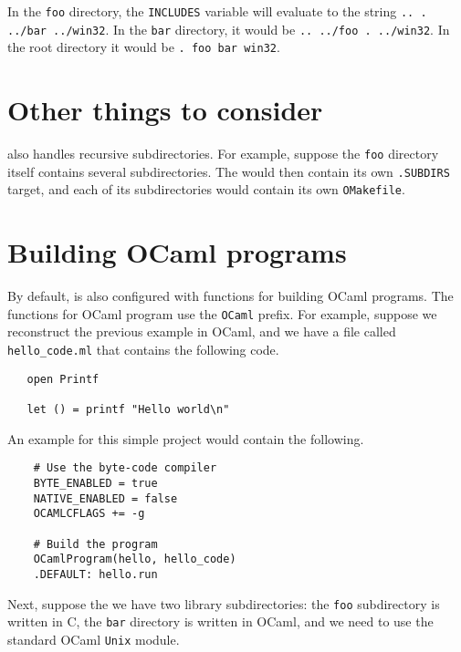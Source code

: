 In the \verb+foo+ directory, the \verb+INCLUDES+ variable will evaluate to
the string \verb+.. . ../bar ../win32+.  In the \verb+bar+ directory,
it would be \verb+.. ../foo . ../win32+.  In the root directory it
would be \verb+. foo bar win32+.

\section{Other things to consider}

 also handles recursive subdirectories.  For example, suppose the \verb+foo+
directory itself contains several subdirectories.  The  would then
contain its own \verb+.SUBDIRS+ target, and each of its subdirectories would
contain its own \verb+OMakefile+.

\section{Building OCaml programs}

By default,  is also configured with functions for building OCaml programs.
The functions for OCaml program use the \verb+OCaml+ prefix.  For example, suppose
we reconstruct the previous example in OCaml, and we have a file called \verb+hello_code.ml+
that contains the following code.

\begin{verbatim}
   open Printf

   let () = printf "Hello world\n"
\end{verbatim}

An example  for this simple project would contain the following.

\begin{verbatim}
    # Use the byte-code compiler
    BYTE_ENABLED = true
    NATIVE_ENABLED = false
    OCAMLCFLAGS += -g

    # Build the program
    OCamlProgram(hello, hello_code)
    .DEFAULT: hello.run
\end{verbatim}

Next, suppose the we have two library subdirectories: the \verb+foo+ subdirectory
is written in C, the \verb+bar+ directory is written in OCaml, and we need to
use the standard OCaml \verb+Unix+ module.

